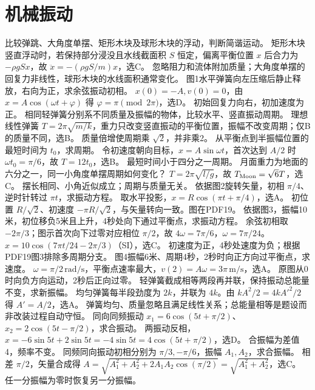 \section{机械振动}
\problemtext 比较弹跳、大角度单摆、矩形木块及球形木块的浮动，判断简谐运动。
\workings 矩形木块竖直浮动时，若保持部分浸没且水线截面积 $S$ 恒定，偏离平衡位置 $x$ 后合力为 $-\rho gSx$，故 $\ddot x=-(\rho gS/m)x$，选C。
\crosscheck 忽略阻力和流体附加质量；大角度单摆的回复力非线性，球形木块的水线面积通常变化。
\problemtext 图1水平弹簧向左压缩后静止释放，右向为正，求余弦振动初相。
\workings $x(0)=-A,v(0)=0$，由 $x=A\cos(\omega t+\varphi)$ 得 $\varphi=\pi\pmod{2\pi}$，选D。
\crosscheck 初始回复力向右，初加速度为正。
\problemtext 相同轻弹簧分别系不同质量及振幅的物体，比较水平、竖直振动周期。
\workings 理想线性弹簧 $T=2\pi\sqrt{m/k}$，重力只改变竖直振动的平衡位置，振幅不改变周期；仅B的质量不同，选B。
\crosscheck 质量倍增使周期乘 $\sqrt2$，并非乘2。
\problemtext 从平衡点到半振幅位置的最短时间为 $t_0$，求周期。
\workings 令初速度朝向目标，$x=A\sin\omega t$，首次达到 $A/2$ 时 $\omega t_0=\pi/6$，故 $T=12t_0$，选B。
\crosscheck 最短时间小于四分之一周期。
\problemtext 月面重力为地面的六分之一，同一小角度单摆周期如何变化？
\workings $T=2\pi\sqrt{l/g}$，故 $T_{\rm Moon}=\sqrt6T$，选C。
\crosscheck 摆长相同、小角近似成立；周期与质量无关。
\problemtext 依据图2旋转矢量，初相 $\pi/4$、逆时针转过 $\pi t$，求振动方程。
\workings 取水平投影，$x=R\cos(\pi t+\pi/4)$，选A。
\crosscheck 初位置 $R/\sqrt2$、初速度 $-\pi R/\sqrt2$，与矢量转向一致。图在PDF19。
\problemtext 依据图3，振幅10米，初位移负5米且上升，4秒处向下通过平衡点，求振动方程。
\workings 余弦初相取 $-2\pi/3$；图示首次向下过零对应相位 $\pi/2$，故 $4\omega=7\pi/6$，$\omega=7\pi/24$。$x=10\cos(7\pi t/24-2\pi/3)$（SI），选C。
\crosscheck 初速度为正，4秒处速度为负；根据PDF19图3排除多周期分支。
\problemtext 图4振幅6米、周期4秒，2秒时向正方向过平衡点，求速度。
\workings $\omega=\pi/2\,\mathrm{rad/s}$，平衡点速率最大，$v(2)=A\omega=3\pi\,\mathrm{m/s}$，选A。
\crosscheck 原图从0时向负方向运动，2秒后正向过零。
\problemtext 轻弹簧截成相等两段再并联，保持振动总能量不变，求新振幅。
\workings 均匀弹簧每半段劲度为 $2k$，并联为 $4k$。由 $kA^2/2=4kA'^2/2$ 得 $A'=A/2$，选A。
\crosscheck 弹簧均匀、质量忽略且满足线性关系；总能量相等是题设而非改装过程自动守恒。
\problemtext 同向同频振动 $x_1=6\cos(5t+\pi/2)$、$x_2=2\cos(5t-\pi/2)$，求合振动。
\workings 两振动反相，$x=-6\sin5t+2\sin5t=-4\sin5t=4\cos(5t+\pi/2)$，选D。
\crosscheck 合振幅为差值4，频率不变。
\problemtext 同频同向振动初相分别为 $\pi/3,-\pi/6$，振幅 $A_1,A_2$，求合振幅。
\workings 相差 $\pi/2$，矢量合成得 $A=\sqrt{A_1^2+A_2^2+2A_1A_2\cos(\pi/2)}=\sqrt{A_1^2+A_2^2}$，选C。
\crosscheck 任一分振幅为零时恢复另一分振幅。


